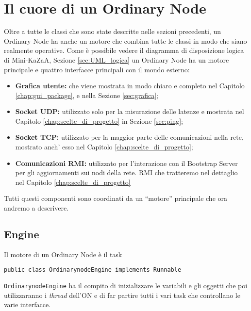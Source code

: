 \section{Il cuore di un Ordinary Node}
Oltre a tutte le classi che sono state descritte nelle sezioni precedenti, un Ordinary Node ha anche un motore che combina tutte le classi in modo che siano realmente operative.
Come è possibile vedere il diagramma di disposizione logica di Mini-KaZaA, Sezione \ref{sec:UML_logica}
un Ordinary Node ha un motore principale e quattro interfacce principali con il mondo esterno:
\begin{itemize}
 \item \textbf{Grafica utente:}
che viene mostrata in modo chiaro e completo nel Capitolo \ref{chap:gui_package}, e nella Sezione \ref{sec:grafica};

 \item \textbf{Socket UDP:}
utilizzato solo per la misurazione delle latenze e mostrata nel Capitolo \ref{chap:scelte_di_progetto} in Sezione \ref{sec:ping};
 
 \item \textbf{Socket TCP:} 
utilizzato per la maggior parte delle comunicazioni nella rete, mostrato anch' esso nel Capitolo \ref{chap:scelte_di_progetto};

 \item \textbf{Comunicazioni RMI:}
utilizzato per l'interazione con il Bootstrap Server per gli aggiornamenti sui nodi della rete.
RMI che tratteremo nel dettaglio nel Capitolo \ref{chap:scelte_di_progetto}
\end{itemize}

Tutti questi componenti sono coordinati da un ``motore'' principale che ora andremo a descrivere.

\subsection{Engine}
Il motore di un Ordinary Node è il task 
\begin{verbatim}
public class OrdinarynodeEngine implements Runnable
\end{verbatim}
\verb|OrdinarynodeEngine| ha il compito di inizializzare le variabili e gli oggetti che poi utilizzaranno i \emph{thread} dell'ON e di far partire tutti i vari task che controllano le varie interfacce.

